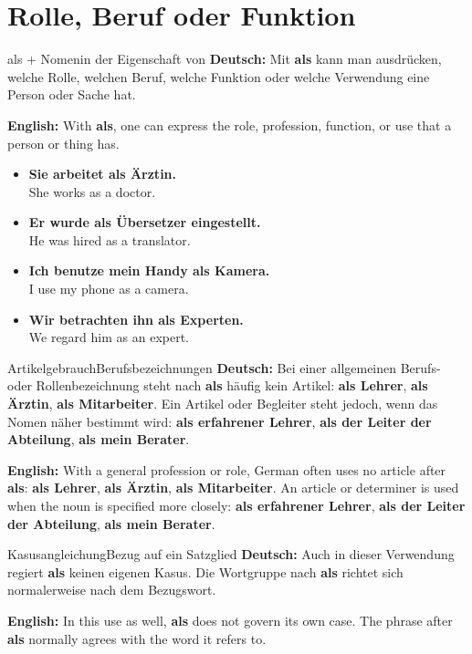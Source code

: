 \documentclass[a4paper,11pt]{article}
\newcommand{\GermanText}[1]{\textbf{Deutsch: }#1\par}
\newcommand{\EnglishText}[1]{{\small\color{SoftGray}\textbf{English: }#1\par}}
\newcommand{\ExampleItem}[2]{\item \textbf{#1}\\{\small\color{SoftGray}#2}}
\begin{document}
    \section{Rolle, Beruf oder Funktion}

        \begin{grammarentry}{als + Nomen}{in der Eigenschaft von}
            \GermanText{Mit \textbf{als} kann man ausdrücken, welche Rolle, welchen Beruf, welche Funktion oder welche Verwendung eine Person oder Sache hat.}
            \EnglishText{With \textbf{als}, one can express the role, profession, function, or use that a person or thing has.}
        \end{grammarentry}

        \begin{exbox}
            \begin{itemize}
                \ExampleItem{Sie arbeitet als Ärztin.}{She works as a doctor.}
                \ExampleItem{Er wurde als Übersetzer eingestellt.}{He was hired as a translator.}
                \ExampleItem{Ich benutze mein Handy als Kamera.}{I use my phone as a camera.}
                \ExampleItem{Wir betrachten ihn als Experten.}{We regard him as an expert.}
            \end{itemize}
        \end{exbox}

        \begin{grammarentry}{Artikelgebrauch}{Berufsbezeichnungen}
            \GermanText{Bei einer allgemeinen Berufs- oder Rollenbezeichnung steht nach \textbf{als} häufig kein Artikel: \textbf{als Lehrer}, \textbf{als Ärztin}, \textbf{als Mitarbeiter}. Ein Artikel oder Begleiter steht jedoch, wenn das Nomen näher bestimmt wird: \textbf{als erfahrener Lehrer}, \textbf{als der Leiter der Abteilung}, \textbf{als mein Berater}.}
            \EnglishText{With a general profession or role, German often uses no article after \textbf{als}: \textbf{als Lehrer}, \textbf{als Ärztin}, \textbf{als Mitarbeiter}. An article or determiner is used when the noun is specified more closely: \textbf{als erfahrener Lehrer}, \textbf{als der Leiter der Abteilung}, \textbf{als mein Berater}.}
        \end{grammarentry}

        \begin{grammarentry}{Kasusangleichung}{Bezug auf ein Satzglied}
            \GermanText{Auch in dieser Verwendung regiert \textbf{als} keinen eigenen Kasus. Die Wortgruppe nach \textbf{als} richtet sich normalerweise nach dem Bezugswort.}
            \EnglishText{In this use as well, \textbf{als} does not govern its own case. The phrase after \textbf{als} normally agrees with the word it refers to.}
        \end{grammarentry}
\end{document}
